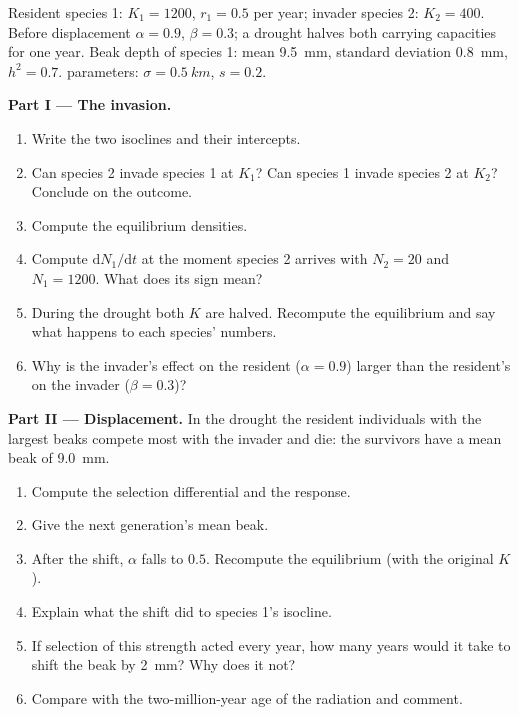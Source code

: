 \begin{problem}
\label{pb:b2:speciation:1}
Resident species 1: $K_1 = 1200$, $r_1 = 0.5$ per year; invader
species 2: $K_2 = 400$. Before displacement $\alpha = 0.9$, $\beta =
0.3$; a drought halves both carrying capacities for one year. Beak
depth of species 1: mean \qty{9.5}{mm}, standard deviation
\qty{0.8}{mm}, $h^{2} = 0.7$.  parameters: $\sigma =
\qty{0.5}{km}$, $s = 0.2$.

\medskip
\noindent\textbf{Part I --- The invasion.}
\begin{enumerate}
  \item Write the two isoclines and their intercepts.
  \item Can species 2 invade species 1 at $K_1$? Can species 1
        invade species 2 at $K_2$? Conclude on the outcome.
  \item Compute the equilibrium densities.
  \item Compute $\mathrm{d}N_1/\mathrm{d}t$ at the moment species 2
        arrives with $N_2 = 20$ and $N_1 = 1200$. What does its sign
        mean?
  \item During the drought both $K$ are halved. Recompute the
        equilibrium and say what happens to each species' numbers.
  \item Why is the invader's effect on the resident ($\alpha = 0.9$)
        larger than the resident's on the invader ($\beta = 0.3$)?
\end{enumerate}

\medskip
\noindent\textbf{Part II --- Displacement.}
In the drought the resident individuals with the largest beaks
compete most with the invader and die: the survivors have a mean
beak of \qty{9.0}{mm}.
\begin{enumerate}[resume]
  \item Compute the selection differential and the response.
  \item Give the next generation's mean beak.
  \item After the shift, $\alpha$ falls to $0.5$. Recompute the
        equilibrium (with the original $K$).
  \item Explain what the shift did to species 1's isocline.
  \item If selection of this strength acted every year, how many
        years would it take to shift the beak by \qty{2}{mm}? Why
        does it not?
  \item Compare with the two-million-year age of the radiation and
        comment.
\end{enumerate}


\end{problem}
